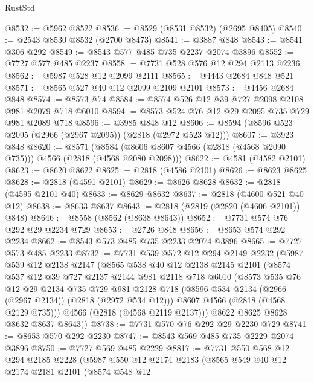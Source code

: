 \begin{lexlean}{RustStd}
\begin{coremodule}
@8532 := @5962 @8522
@8536 := @8529 (@8531 @8532) (@2695 @8405)
@8540 := @2543 @8530 @8532 (@2700 @8473)
@8541 := @3887 @848
@8543 := @8541 @306 @292
@8549 := @8543 @577 @485 @735 @2237 @2074 @3896
@8552 := @7727 @577 @485 @2237
@8558 := @7731 @528 @576 @12 @294 @2113 @2236
@8562 := @5987 @528 @12 @2099 @2111
@8565 := @4443 @2684 @848 @521
@8571 := @8565 @527 @40 @12 @2099 @2109 @2101
@8573 := @4456 @2684 @848
@8574 := @8573 @74
@8584 := @8574 @526 @12 @39 @727 @2098 @2108 @981 @2079 @718 @6010
@8594 := @8573 @524 @76 @12 @29 @2095 @735 @729 @981 @2089 @718
@8596 := @3985 @848 @12
@8606 := @8594 (@8596 @523 @2095 (@2966 (@2967 @2095)) (@2818 (@2972 @523 @12)))
@8607 := @3923 @848
@8620 := @8571
    (@8584 (@8606 @8607 @4566 (@2818 (@4568 @2090 @735))) @4566 (@2818 (@4568 @2080 @2098)))
@8622 := @4581 (@4582 @2101)
@8623 := @8620 @8622
@8625 := @2818 (@4586 @2101)
@8626 := @8623 @8625
@8628 := @2818 (@4591 @2101)
@8629 := @8626 @8628
@8632 := @2818 (@4595 @2101 @40)
@8633 := @8629 @8632
@8637 := @2818 (@4600 @521 @40 @12)
@8638 := @8633 @8637
@8643 := @2818 (@2819 (@2820 (@4606 @2101)) @848)
@8646 := @8558 (@8562 (@8638 @8643))
@8652 := @7731 @574 @76 @292 @29 @2234 @729
@8653 := @2726 @848
@8656 := @8653 @574 @292 @2234
@8662 := @8543 @573 @485 @735 @2233 @2074 @3896
@8665 := @7727 @573 @485 @2233
@8732 := @7731
    @539
    @572
    @12
    @294
    @2149
    @2232
    (@5987
      @539
      @12
      @2138
      @2147
      (@8565
        @538
        @40
        @12
        @2138
        @2145
        @2101
        (@8574
          @537
          @12
          @39
          @727
          @2137
          @2144
          @981
          @2118
          @718
          @6010
          (@8573
            @535
            @76
            @12
            @29
            @2134
            @735
            @729
            @981
            @2128
            @718
            (@8596 @534 @2134 (@2966 (@2967 @2134)) (@2818 (@2972 @534 @12)))
            @8607
            @4566
            (@2818 (@4568 @2129 @735)))
          @4566
          (@2818 (@4568 @2119 @2137)))
        @8622
        @8625
        @8628
        @8632
        @8637
        @8643))
@8738 := @7731 @570 @76 @292 @29 @2230 @729
@8741 := @8653 @570 @292 @2230
@8747 := @8543 @569 @485 @735 @2229 @2074 @3896
@8750 := @7727 @569 @485 @2229
@8817 := @7731
    @550
    @568
    @12
    @294
    @2185
    @2228
    (@5987
      @550
      @12
      @2174
      @2183
      (@8565
        @549
        @40
        @12
        @2174
        @2181
        @2101
        (@8574
          @548
          @12

\end{coremodule}
\end{lexlean}
